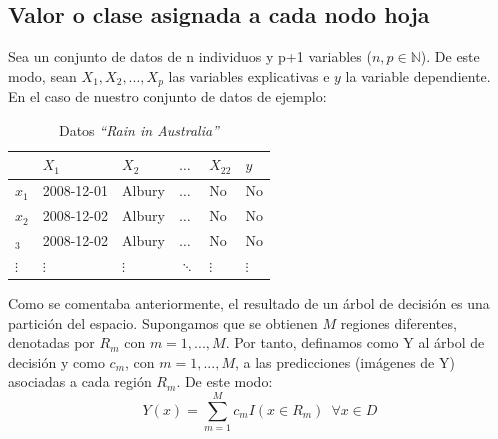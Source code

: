 \documentclass[12pt,twoside]{article}
\begin{document}
\subsection{Valor o clase asignada a cada nodo hoja} \label{sec:2.4}
Sea un conjunto de datos de n individuos y p+1 variables ($n,p \in \mathbb{N}$). De este modo, sean $X_1, X_2, ... , X_p$ las variables explicativas e $y$ la variable dependiente. En el caso de nuestro conjunto de datos de ejemplo:
\begin{table}[h]
\centering
\begin{tabular}{l|l|l|l|l|l|}
\cline{2-6}
                                                       & \cellcolor[HTML]{C0C0C0}$X_1$ & \cellcolor[HTML]{C0C0C0}$X_2$ & \cellcolor[HTML]{C0C0C0}$\dots$ & \cellcolor[HTML]{C0C0C0}$X_{22}$ & \cellcolor[HTML]{9B9B9B}$y$ \\ \hline
\multicolumn{1}{|l|}{\cellcolor[HTML]{C0C0C0}$x_1$}    & 2008-12-01                    & Albury                        & $\dots$                         & No                               & No                          \\ \hline
\multicolumn{1}{|l|}{\cellcolor[HTML]{C0C0C0}$x_2$}    & 2008-12-02                    & Albury                        & $\dots$                         & No                               & No                          \\ \hline
\multicolumn{1}{|l|}{\cellcolor[HTML]{C0C0C0}$_3$}     & 2008-12-02                    & Albury                        & $\dots$                         & No                               & No                          \\ \hline
\multicolumn{1}{|l|}{\cellcolor[HTML]{C0C0C0}$\vdots$} & $\vdots$                      & $\vdots$                      & $\ddots$                        & $\vdots$                         & $\vdots$                    \\ \hline
\end{tabular}
\caption{Datos \textit{``Rain in Australia''}}
\label{tab:Datos}
\end{table}

Como se comentaba anteriormente, el resultado de un árbol de decisión es una partición del espacio. Supongamos que se obtienen $M$ regiones diferentes, denotadas por $R_{m}$ con $m = 1, ..., M$. Por tanto, definamos como Y al árbol de decisión y como $c_m$, con $m = 1,...,M$, a las predicciones (imágenes de Y) asociadas a cada región $R_m$. De este modo:
\begin{equation*}
Y(x) = \sum^M_{m = 1} c_{m}I(x \in R_m) \, \, \, \forall x \in D
\end{equation*}
\end{document}
